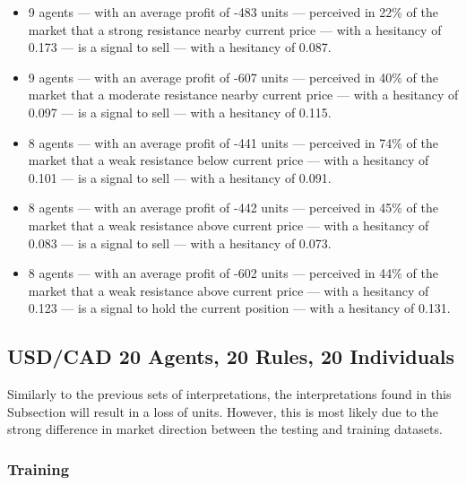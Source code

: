 {\small
  \begin{itemize}
  \item 9 agents — with an average profit of -483 units — perceived in 22\% of
    the market that a strong resistance nearby current price — with a hesitancy
    of 0.173 — is a signal to sell — with a hesitancy of 0.087.
  \item 9 agents — with an average profit of -607 units — perceived in 40\% of
    the market that a moderate resistance nearby current price — with a
    hesitancy of 0.097 — is a signal to sell — with a hesitancy of 0.115.
  \item 8 agents — with an average profit of -441 units — perceived in 74\% of
    the market that a weak resistance below current price — with a hesitancy of
    0.101 — is a signal to sell — with a hesitancy of 0.091.
  \item 8 agents — with an average profit of -442 units — perceived in 45\% of
    the market that a weak resistance above current price — with a hesitancy of
    0.083 — is a signal to sell — with a hesitancy of 0.073.
  \item 8 agents — with an average profit of -602 units — perceived in 44\% of
    the market that a weak resistance above current price — with a hesitancy of
    0.123 — is a signal to hold the current position — with a hesitancy of
    0.131.
  \end{itemize}
}

\subsection{USD/CAD 20 Agents, 20 Rules, 20 Individuals}
\label{}

Similarly to the previous sets of interpretations, the interpretations found in this Subsection will result in a loss of units. However, this is most likely due to the strong difference in market direction between the testing and training datasets.

\subsubsection{Training}
\label{}

